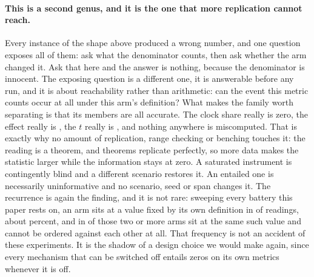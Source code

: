 \documentclass[11pt]{article}
\begin{document}
\paragraph{This is a second genus, and it is the one that more replication cannot reach.} Every instance of the shape above produced a wrong number, and one question exposes all of them: ask what the denominator counts, then ask whether the arm changed it. Ask that here and the answer is nothing, because the denominator is innocent. The exposing question is a different one, it is answerable before any run, and it is about reachability rather than arithmetic: can the event this metric counts occur at all under this arm's definition? What makes the family worth separating is that its members are all accurate. The clock share really is zero, the effect really is \GhStaleTwentyFour{}, the $t$ really is \GhStaleT{}, and nothing anywhere is miscomputed. That is exactly why no amount of replication, range checking or benching touches it: the reading is a theorem, and theorems replicate perfectly, so more data makes the statistic larger while the information stays at zero. A saturated instrument is contingently blind and a different scenario restores it. An entailed one is necessarily uninformative and no scenario, seed or span changes it. The recurrence is again the finding, and it is not rare: sweeping every battery this paper rests on, an arm sits at a value fixed by its own definition in \PnPinned{} of \PnCells{} readings, about \PnPinnedPct{} percent, and in \PnSamePair{} of those two or more arms sit at the same such value and cannot be ordered against each other at all. That frequency is not an accident of these experiments. It is the shadow of a design choice we would make again, since every mechanism that can be switched off entails zeros on its own metrics whenever it is off.
\end{document}
